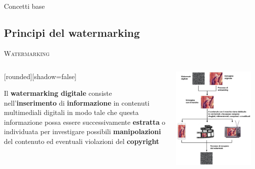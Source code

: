 \documentclass{beamer}
\begin{document}
\begin{section}{Concetti base}
\subsection {Principi del watermarking}
\begin{frame}[t]{\textsc{Watermarking}}
\begin{columns}
\begin{column}{5cm}
\vspace{1em}
	[rounded][shadow=false]
\begin{block}{}
\center \small{Il \textbf{watermarking digitale} consiste nell'\textbf{inserimento} di \textbf{informazione} in contenuti  multimediali digitali in modo tale che questa informazione possa essere successivamente \textbf{estratta} o individuata per investigare possibili \textbf{manipolazioni} del contenuto ed eventuali violazioni del \textbf{copyright}}
\end{block}
\end{column}
\begin{column}{5cm}
\centering
\includegraphics[width=0.9\linewidth]{./img/wat_workflow.jpg}
\end{column}
\end{columns}
\end{frame}


\end{section}
\end{document}
